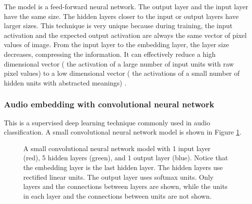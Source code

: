 \documentclass[conference]{IEEEtran}
\begin{document}
The model is a feed-forward neural network.
The output layer and the input layer have the same size.
The hidden layers closer to the input or output layers have larger sizes.
This technique is very unique because during training,
the input activation and the expected output activation are always
the same vector of pixel values of image.
From the input layer to the embedding layer, the layer size decreases,
compressing the information.
It can effectively reduce a high dimensional vector (
the activation of a large number of input units with raw pixel values)
to a low dimensional vector (
the activations of a small number of hidden units with abstracted meanings)
\cite{hinton2006reducing}.

\subsubsection{Audio embedding with convolutional neural network}
This is a supervised deep learning technique commonly used in audio classification.
A small convolutional neural network model is shown in Figure \ref{fig:cnn}.
\begin{figure}[!ht]
	\centering
	\newcommand{\layersep}{1cm}
	\caption{
		A small convolutional neural network model with
		1 input layer (red), 5 hidden layers (green), and 1 output layer (blue).
		Notice that the embedding layer is the last hidden layer.
		The hidden layers use rectified linear units.
		The output layer uses softmax units.
		Only layers and the connections between layers are shown, while the units in each layer and the connections between units are not shown.
	}
	\label{fig:cnn}
\end{figure}
\end{document}
